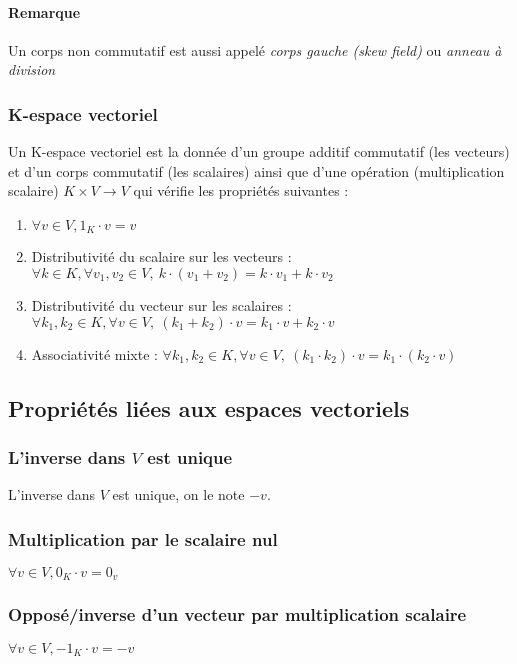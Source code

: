 \documentclass[a4paper,10pt]{article}
\newcommand{\ap}{ \rightarrow} %
\begin{document}
   \paragraph{Remarque} Un corps non commutatif est aussi appelé \textit{corps gauche (skew field)} ou \textit{anneau à division}
  \subsubsection{K-espace vectoriel}
   Un K-espace vectoriel est la donnée d'un groupe additif commutatif (les
   vecteurs) et d'un corps commutatif (les scalaires) ainsi que d'une opération
   (multiplication scalaire) $K \times V \ap V$ qui vérifie les propriétés
   suivantes :
    \begin{enumerate}
     \item $\forall v \in V, 1_K \cdot v = v$
     \item Distributivité du scalaire sur les vecteurs : $\forall k \in K, \forall v_1, v_2 \in V,~ k \cdot (v_1+v_2) = k \cdot v_1+k \cdot v_2$
     \item Distributivité du vecteur sur les scalaires : $\forall k_1, k_2 \in K, \forall v \in V,~ (k_1+k_2) \cdot v = k_1\cdot v + k_2 \cdot v$
     \item Associativité mixte : $\forall k_1,k_2 \in K, \forall v \in V,~ (k_1 \cdot k_2) \cdot v = k_1 \cdot (k_2 \cdot v)$
    \end{enumerate}


 \subsection{Propriétés liées aux espaces vectoriels}
 \subsubsection{L'inverse dans $V$ est unique}
   L'inverse dans $V$ est unique, on le note $-v$.

  \subsubsection{Multiplication par le scalaire nul}
   $\forall v \in V, 0_K \cdot v = 0_v$

  \subsubsection{Opposé/inverse d'un vecteur par multiplication scalaire}
   $\forall v \in V, -1_K \cdot v = -v$
\end{document}
